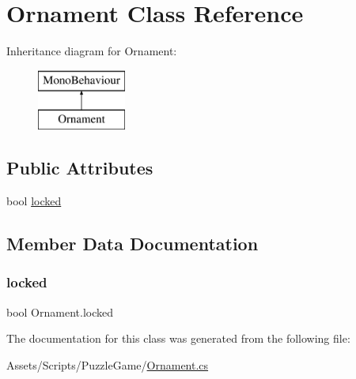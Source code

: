 \hypertarget{class_ornament}{}\section{Ornament Class Reference}
\label{class_ornament}
Inheritance diagram for Ornament\+:\begin{figure}[H]
\begin{center}
\leavevmode
\includegraphics[height=2.000000cm]{class_ornament}
\end{center}
\end{figure}
\subsection*{Public Attributes}
\begin{DoxyCompactItemize}
\item 
bool \mbox{\hyperlink{class_ornament_abbdf4ce334356bac00965b2e72f4c0b1}{locked}}
\end{DoxyCompactItemize}


\subsection{Member Data Documentation}
\mbox{\label{class_ornament_abbdf4ce334356bac00965b2e72f4c0b1}} 
\subsubsection{\texorpdfstring{locked}{locked}}
{\footnotesize\ttfamily bool Ornament.\+locked}



The documentation for this class was generated from the following file\+:\begin{DoxyCompactItemize}
\item 
Assets/\+Scripts/\+Puzzle\+Game/\mbox{\hyperlink{_ornament_8cs}{Ornament.\+cs}}\end{DoxyCompactItemize}
